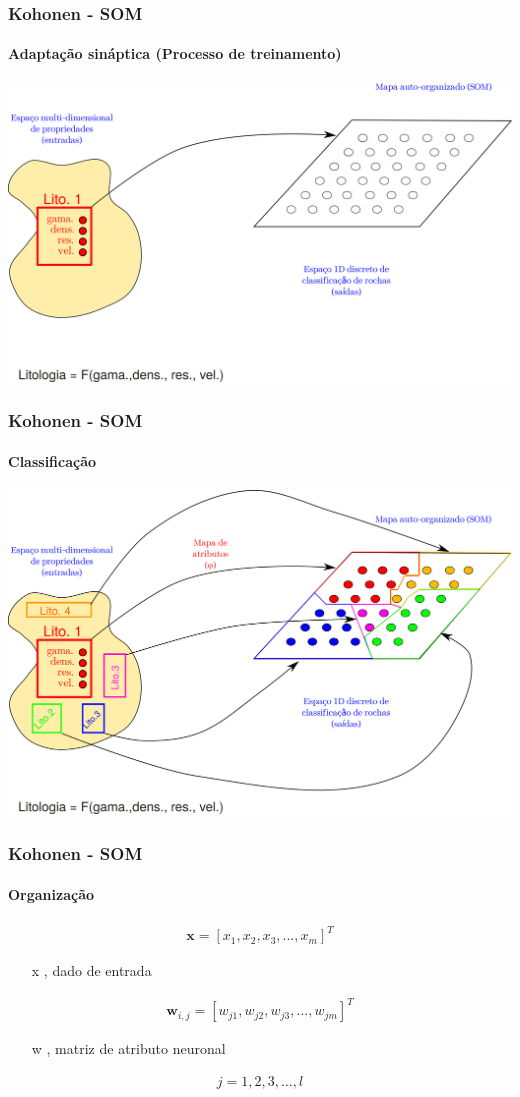 \documentclass[aspectratio=10]{beamer} %
\begin{document}
\begin{frame}
	\frametitle{Kohonen - SOM}
	\framesubtitle{Adaptação sináptica (Processo de treinamento)}
	\includegraphics[scale=0.5]{Imagens/Introkoho3.png} 
\end{frame}


\begin{frame}
	\frametitle{Kohonen - SOM}
	\framesubtitle{Classificação}
	\includegraphics[scale=0.5]{Imagens/Introkoho4.png} 
\end{frame}

\begin{frame}
	\frametitle{Kohonen - SOM}
	\framesubtitle{Organização}
	
	\begin{eqnarray}
	\textbf{x}=[x_{1}, x_{2}, x_{3}, ..., x_{m}]^{T} \nonumber
	\end{eqnarray}
	\pause
	\begin{itemize}
		\centering
		\item[x], dado de entrada 
		\pause
	\end{itemize}
	\begin{eqnarray}
	\textbf{w}_{i,j}= [w_{j1}, w_{j2}, w_{j3}, ..., w_{jm}]^{T} \nonumber
	\end{eqnarray}
	\pause
	\begin{itemize}
		\centering
		\item[w], matriz de atributo neuronal 
	\end{itemize}
	\begin{eqnarray}
	j=1,2,3,\hdots,l \nonumber
	\end{eqnarray}
\end{frame}
\end{document}
